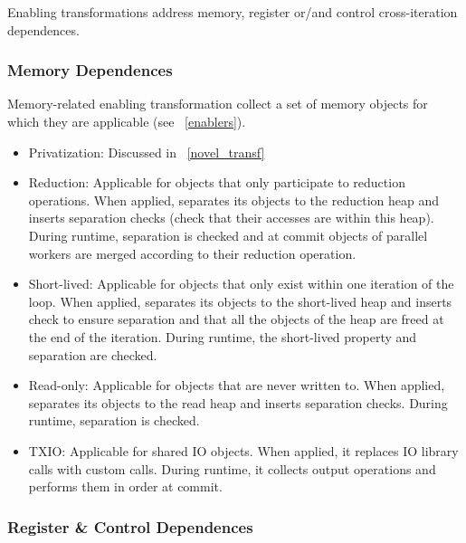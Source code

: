 Enabling transformations address memory, register or/and control
cross-iteration dependences.

\subsubsection{Memory Dependences}

Memory-related enabling transformation collect a set of memory objects
for which they are applicable (see ~\ref{enablers}).

\begin{itemize}
%
\item Privatization: Discussed in ~\ref{novel_transf}

\item Reduction: Applicable for objects that only participate to
reduction operations. When applied, separates its objects to the
reduction heap and inserts separation checks (check that their
accesses are within this heap). During runtime, separation is checked
and at commit objects of parallel workers are
merged according to their reduction operation.




\item Short-lived: Applicable for objects that only exist within one
iteration of the loop. When applied, separates its objects to the
short-lived heap and inserts check to ensure separation and that all
the objects of the heap are freed at the end of the iteration. During
runtime, the short-lived property and separation are checked.

\item Read-only: Applicable for objects that are never written to.
When applied, separates its objects to the read heap and inserts
separation checks.  During runtime, separation is checked.

\item TXIO: Applicable for shared IO objects. When applied, it
replaces IO library calls with custom calls. During runtime, it
collects output operations and performs them in order at commit.

\end{itemize}

\subsubsection{Register \& Control Dependences}

